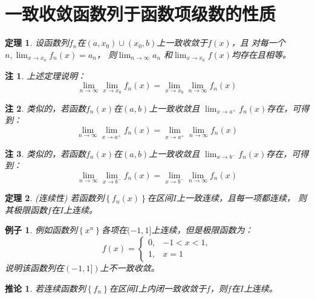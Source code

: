 \documentclass[a4paper,12pt]{article}
\newtheorem{theorem}{定理}
\newtheorem{example}{例子}
\newtheorem{corollary}{推论}
\newtheorem{remark}{注}
\begin{document}
\section{一致收敛函数列于函数项级数的性质}
\begin{theorem}
    设函数列$\displaystyle f_n$在$(a,x_0) \cup (x_0, b)$上一致收敛于$f(x)$，且
    对每一个$ \displaystyle n, \lim_{x \to x_0}f_n(x) = a_n$，
    则$\displaystyle \lim_{n \to \infty} a_n$
    和$\lim_{x \to x_0}f(x)$均存在且相等。
\end{theorem}

\begin{remark}
    上述定理说明：
    \begin{equation}
        \lim_{n \to \infty}\lim_{x \to x_0}f_n(x) = \lim_{x \to x_0}\lim_{n \to \infty}f_n(x)
        \label{eq:eq9}
    \end{equation}
\end{remark}
\begin{remark}
    类似的，若函数$\displaystyle f_n(x)$在$(a,b)$上一致收敛且
    $\displaystyle \lim_{x \to a^+}f_n(x)$存在，可得到：
    \[
        \lim_{n \to \infty}\lim_{x \to a^+}f_n(x) = \lim_{x \to a^+}\lim_{n \to \infty}f_n(x)
        \]
\end{remark}
\begin{remark}
    类似的，若函数$\displaystyle f_n(x)$在$(a,b)$上一致收敛且
    $\displaystyle \lim_{x \to b^-}f_n(x)$存在，可得到：
    \[
        \lim_{n \to \infty}\lim_{x \to b^-}f_n(x) = \lim_{x \to b^-}\lim_{n \to \infty}f_n(x)
        \]
\end{remark}

\begin{theorem}{\rm (连续性)}
    若函数列$\displaystyle \left\{f_n(x)\right\}$在区间$I$上一致连续，且每一项都连续，
    则其极限函数$f$在$I$上连续。
\end{theorem}

\begin{example}
    例如函数列$\displaystyle \left\{x^n\right\}$各项在$(-1, 1]$上连续，但是极限函数为：
     \[
         f(x) = \left\{\begin{array}{ll} 0, & -1 < x < 1, \\
                                   1, & x = 1 
                 \end{array}\right.
                 \]
             说明该函数列在$(-1,1])$上不一致收敛。
\end{example}

\begin{corollary}
    若连续函数列$\left\{f_n\right\}$在区间$I$上内闭一致收敛于$f$，则$f$在$I$上连续。
\end{corollary}
\end{document}
